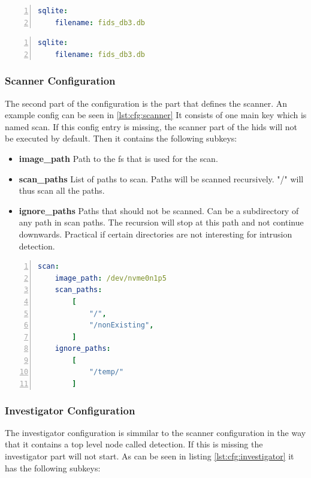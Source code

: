 \documentclass[
	a4paper,					%
	10pt,							%
	twoside,					%
	openright,				%
	notitlepage,			%
	parskip=half,			%
]{scrreprt}					%
\begin{document}
\begin{lstlisting}[language=yaml, numbers=left, caption=SQLite Configuration, label=lst:cfg:sqlite]
sqlite:
	filename: fids_db3.db
\end{lstlisting}


\begin{lstlisting}[language=yaml, numbers=left, caption=Postgres Configuration, label=lst:cfg:postgres]
sqlite:
	filename: fids_db3.db
\end{lstlisting}

\subsubsection{Scanner Configuration}

The second part of the configuration is the part that defines the scanner. An example config can be seen in \ref{lst:cfg:scanner} It consists of one main key which is named scan. If this config entry is missing, the scanner part of the \gls{hids} will not be executed by default. Then it contains the following subkeys:

\begin{itemize}
	\item		\textbf{image\_path} Path to the \gls{fs} that is used for the scan.
	\item		\textbf{scan\_paths} List of paths to scan. Paths will be scanned recursively. "/" will thus scan all the paths.
	\item		\textbf{ignore\_paths} Paths that should not be scanned. Can be a subdirectory of any path in scan paths. The recursion will stop at this path and not continue downwards. Practical if certain directories are not interesting for intrusion detection.
\end{itemize}

\begin{lstlisting}[language=yaml, numbers=left, caption=Scanner Configuration, label=lst:cfg:scanner]
scan:
	image_path: /dev/nvme0n1p5
	scan_paths: 
		[
			"/",
			"/nonExisting",
		]
	ignore_paths: 
		[
			"/temp/"
		]
\end{lstlisting}

\subsubsection{Investigator Configuration}

The investigator configuration is simmilar to the scanner configuration in the way that it contains a top level node called detection. If this is missing the investigator part will not start. As can be seen in listing \ref{lst:cfg:investigator} it has the following subkeys:
\end{document}
